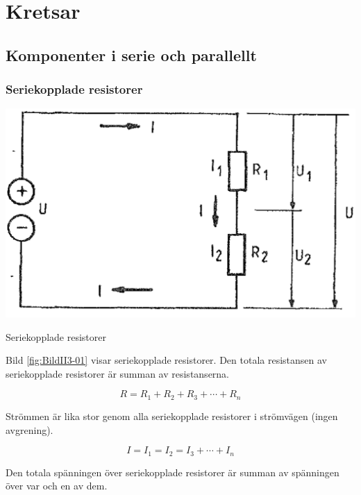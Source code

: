 \chapter{Kretsar}

\section[Serie och parallellt]{Komponenter i serie och parallellt}

\subsection{Seriekopplade resistorer}

\begin{marginfigure}
\includegraphics[width=\textwidth]{images/cropped_pdfs/bild_2_3-01.pdf}
\caption{Seriekopplade resistorer}
\label{fig:BildII3-01}
\end{marginfigure}

Bild \ref{fig:BildII3-01} visar seriekopplade resistorer.
Den totala resistansen av seriekopplade resistorer är summan av resistanserna.

\[   R = R_1 + R_2 + R_3 + \cdots + R_n   \]

Strömmen är lika stor genom alla seriekopplade resistorer i strömvägen (ingen
avgrening).

\[   I = I_1 = I_2 = I_3 + \cdots + I_n   \]

Den totala spänningen över seriekopplade resistorer är summan av spänningen över
var och en av dem.

